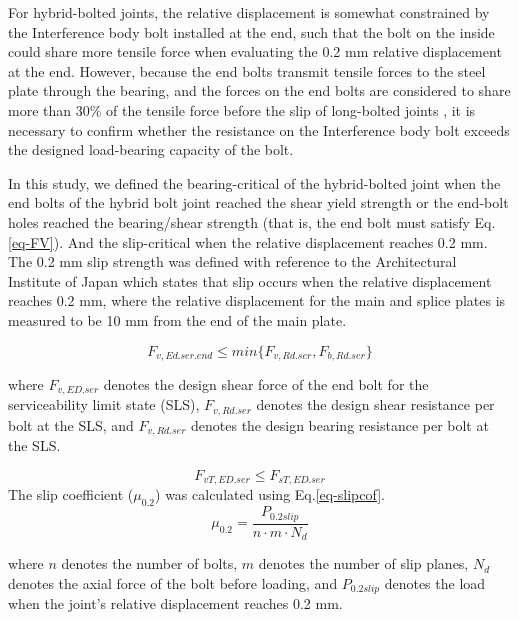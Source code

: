 For hybrid-bolted joints, the relative displacement is somewhat constrained by the Interference body bolt installed at the end, such that the bolt on the inside could share more tensile force when evaluating the 0.2 mm relative displacement at the end. However, because the end bolts transmit tensile forces to the steel plate through the bearing, and the forces on the end bolts are considered to share more than 30\% of the tensile force before the slip of long-bolted joints \cite{Zhanghuazhi2000,chinarailway2005}, it is necessary to confirm whether the resistance on the Interference body bolt exceeds the designed load-bearing capacity of the bolt. 

In this study, we defined the bearing-critical of the hybrid-bolted joint when the end bolts of the hybrid bolt joint reached the shear yield strength or the end-bolt holes reached the bearing/shear strength (that is, the end bolt must satisfy Eq.\ref{eq-FV}). And the slip-critical when the relative displacement reaches 0.2 mm. The 0.2 mm slip strength was defined with reference to the Architectural Institute of Japan \cite{2012AIJStructures} which states that slip occurs when the relative displacement reaches 0.2 mm, where the relative displacement for the main and splice plates is measured to be 10 mm from the end of the main plate. 

\begin{equation}
    F_{v,Ed.ser.end} \leq min\{F_{v,Rd.ser}, F_{b,Rd.ser}\}
    \label{eq-FV}
\end{equation}

where $F_{v,ED.ser}$ denotes the design shear force of the end bolt for the serviceability limit state (SLS), $F_{v,Rd.ser}$ denotes the design shear resistance per bolt at the SLS, and $F_{v,Rd.ser}$ denotes the design bearing resistance per bolt at the SLS.

\begin{equation}
    F_{vT,ED.ser} \leq F_{sT,ED.ser}
\end{equation}
The slip coefficient ($\mu_{0.2}$) was calculated using Eq.\ref{eq-slipcof}.
\begin{equation}
    \mu_{0.2} = \frac{P_{0.2slip}}{n \cdot m \cdot N_d}
    \label{eq-slipcof}
\end{equation}

where $n$ denotes the number of bolts, $m$ denotes the number of slip planes, $N_d$ denotes the axial force of the bolt before loading, and $P_{0.2slip}$ denotes the load when the joint's relative displacement reaches 0.2 mm.


